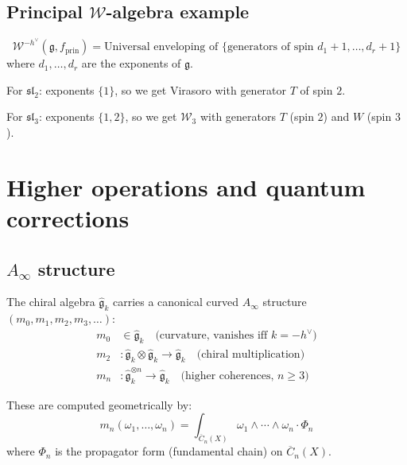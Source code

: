 \subsection{Principal $\mathcal{W}$-algebra example}

\begin{theorem}
\label{thm:principal-w-algebra-structure}
\begin{equation}
\mathcal{W}^{-h^\vee}(\mathfrak{g}, f_{\mathrm{prin}}) = \text{Universal enveloping of } \{\text{generators of spin } d_1+1, \ldots, d_r+1\}
\end{equation}
where $d_1, \ldots, d_r$ are the exponents of $\mathfrak{g}$.

For $\mathfrak{sl}_2$: exponents $\{1\}$, so we get Virasoro with generator $T$ of spin $2$.

For $\mathfrak{sl}_3$: exponents $\{1,2\}$, so we get $\mathcal{W}_3$ with generators $T$ (spin $2$) and $W$ (spin $3$).
\end{theorem}

\section{Higher operations and quantum corrections}

\subsection{\texorpdfstring{$A_\infty$ structure}{A- structure}}

\begin{theorem}\label{thm:kac-moody-ainfty}
The chiral algebra $\widehat{\mathfrak{g}}_k$ carries a canonical curved $A_\infty$ structure $(m_0, m_1, m_2, m_3, \ldots)$:
\begin{align}
m_0 &\in \widehat{\mathfrak{g}}_k \quad \text{(curvature, vanishes iff } k = -h^\vee\text{)} \\
m_2 &: \widehat{\mathfrak{g}}_k \otimes \widehat{\mathfrak{g}}_k \to \widehat{\mathfrak{g}}_k \quad \text{(chiral multiplication)} \\
m_n &: \widehat{\mathfrak{g}}_k^{\otimes n} \to \widehat{\mathfrak{g}}_k \quad \text{(higher coherences, } n \geq 3\text{)}
\end{align}

These are computed geometrically by:
\begin{equation}
m_n(\omega_1, \ldots, \omega_n) = \int_{\overline{C}_n(X)} \omega_1 \wedge \cdots \wedge \omega_n \cdot \Phi_n
\end{equation}
where $\Phi_n$ is the propagator form (fundamental chain) on $\overline{C}_n(X)$.
\end{theorem}

